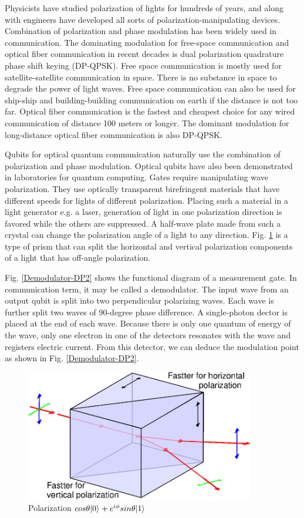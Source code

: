 \documentclass[oneside, letter, 12pt]{book}
\begin{document}
Physicists have studied polarization of lights for hundreds of years, and along with engineers have developed all sorts of polarization-manipulating devices. Combination of polarization and phase modulation has been widely used in communication. The dominating modulation for free-space communication and optical fiber communication in recent decades is dual polarization quadrature phase shift keying (DP-QPSK). Free space communication is mostly used for satellite-satellite communication in space. There is no substance in space to degrade the power of light waves. Free space communication can also be used for ship-ship and building-building communication on earth if the distance is not too far. Optical fiber communication is the fastest and cheapest choice for any wired communication of distance 100 meters or longer. The dominant modulation for long-distance optical fiber communication is also DP-QPSK.

Qubits for optical quantum communication naturally use the combination of polarization and phase modulation. Optical qubits have also been demonstrated in laboratories for quantum computing. Gates require manipulating wave polarization. They use optically transparent birefringent materials that have different speeds for lights of different polarization. Placing such a material in a light generator e.g. a laser, generation of light in one polarization direction is favored while the others are suppressed. A half-wave plate made from such a crystal can change the polarization angle of a light to any direction. Fig. \ref{Polarization-splitter} is a type of prism that can split the horizontal and vertical polarization components of a light that has off-angle polarization.

Fig. \ref{Demodulator-DP2} shows the functional diagram of a measurement gate. In communication term, it may be called a demodulator. The input wave from an output qubit is split into two perpendicular polarizing waves. Each wave is further split two waves of 90-degree phase difference. A single-photon dector is placed at the end of each wave. Because there is only one quantum of energy of the wave, only one electron in one of the detectors resonates with the wave and registers electric current. From this detector, we can deduce the modulation point as shown in Fig. \ref{Demodulator-DP2}.

\begin{figure}[h]
\includegraphics[width=10cm]{pic/polarization-prism.eps}
\caption{Polarization $cos{\theta} \vert {0} \rangle_{} + e^{i \phi} sin{\theta} \vert {1} \rangle_{}$}
\label{Polarization-splitter}
\end{figure}
\end{document}
